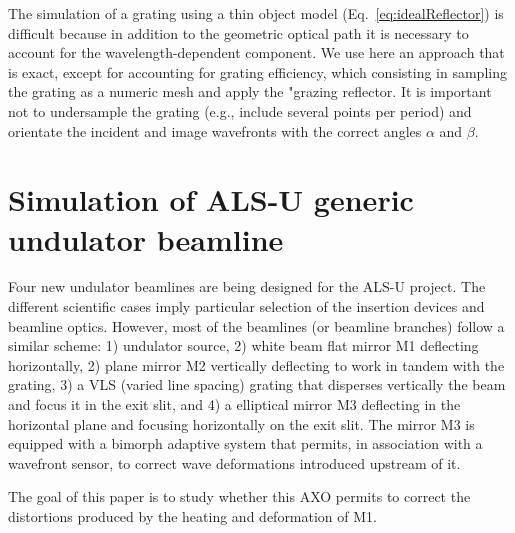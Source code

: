 \documentclass[preprint]{iucr}              %
\newcommand{\todo}[1]{{\color{red}[TODO: "#1'']}}
\begin{document}
The simulation of a grating using a thin object model (Eq.~\ref{eq:idealReflector}) is difficult because in addition to the geometric optical path it is necessary to account for the wavelength-dependent component. We use here an approach that is exact, except for accounting for grating efficiency, which consisting in sampling the grating as a numeric mesh and apply the "grazing reflector. It is important not to undersample the grating (e.g., include several points per period) and orientate the incident and image wavefronts with the correct angles $\alpha$ and $\beta$.      



\section{Simulation of ALS-U generic undulator beamline}
\label{sec:main}

Four new undulator beamlines are being designed for the ALS-U project. The different scientific cases imply particular selection of the insertion devices and beamline optics. However, most of the beamlines (or beamline branches) follow a similar scheme: 1) undulator source, 2) white beam flat mirror M1 deflecting horizontally, 2) plane mirror M2 vertically deflecting to work in tandem with the grating, 3) a VLS (varied line spacing) grating that disperses vertically the beam and focus it in the exit slit, and 4) a elliptical mirror M3 deflecting in the horizontal plane and focusing horizontally on the exit slit. The mirror M3 is equipped with a bimorph adaptive system that permits, in association with a wavefront sensor, to correct wave deformations introduced upstream of it.

The goal of this paper is to study whether this AXO permits to correct the distortions produced by the heating and deformation of M1.
\end{document}

